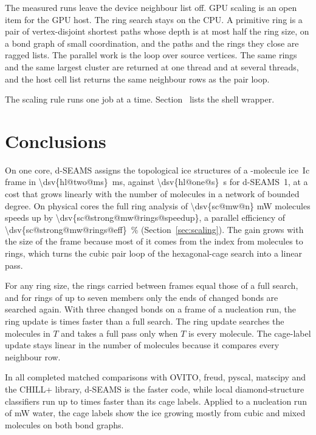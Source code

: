 \documentclass[preprint,12pt]{elsarticle}
\begin{document}
The measured runs leave the device neighbour list off.
GPU scaling is an open item for the GPU host.
The ring search stays on the CPU.
A primitive ring is a pair of vertex-disjoint shortest paths whose depth is at most half the ring size, on a bond graph of small coordination, and the paths and the rings they close are ragged lists.
The parallel work is the loop over source vertices.
The same rings and the same largest cluster are returned at one thread and at several threads, and the host cell list returns the same neighbour rows as the pair loop.

The scaling rule runs one job at a time.
Section~ lists the shell wrapper.

\section{Conclusions}
\label{sec:conclusions}

On one core, d-SEAMS assigns the topological ice structures of a -molecule ice~Ic frame in \qty{\dsv{hl@two@ms}}{\milli\second}, against \qty{\dsv{hl@one@s}}{\second} for d-SEAMS~1, at a cost that grows linearly with the number of molecules in a network of bounded degree.
On  physical cores the full ring analysis of \num{\dsv{sc@mw@n}} mW molecules speeds up by \num{\dsv{sc@strong@mw@rings@speedup}}, a parallel efficiency of \qty{\dsv{sc@strong@mw@rings@eff}}{\percent} (Section~\ref{sec:scaling}).
The gain grows with the size of the frame because most of it comes from the index from molecules to rings, which turns the cubic pair loop of the hexagonal-cage search into a linear pass.

For any ring size, the rings carried between frames equal those of a full search, and for rings of up to seven members only the ends of changed bonds are searched again.
With three changed bonds on a frame of a nucleation run, the ring update is  times faster than a full search.
The ring update searches the molecules in $T$ and takes a full pass only when $T$ is every molecule.
The cage-label update stays linear in the number of molecules because it compares every neighbour row.

In all  completed matched comparisons with OVITO, freud, pyscal, matscipy and the CHILL+ library, d-SEAMS is the faster code, while local diamond-structure classifiers run up to  times faster than its cage labels.
Applied to a nucleation run of mW water, the cage labels show the ice growing mostly from cubic and mixed molecules on both bond graphs.
\end{document}
